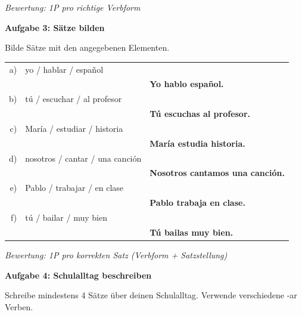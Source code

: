 \documentclass[11pt, a4paper]{article}
\newcommand{\fachfarbe}{spanisch}
\newcommand{\punktebox}[1]{\hfill\fbox{\small \_/#1}}
\newcommand{\loesung}[1]{\textcolor{loesung}{\textbf{#1}}}
\newenvironment{aufgabe}[1]{%
    \needspace{5\baselineskip}%
    \nopagebreak[4]%
    \vspace{10pt}
    \noindent\textbf{\textcolor{\fachfarbe}{Aufgabe #1}}
    \nopagebreak[4]%
    \vspace{5pt}
    \nopagebreak[4]%
    \begin{list}{}{\leftmargin=0pt}
    \item[]
}{%
    \end{list}
}
\begin{document}
\vspace{0.5em}
\textit{\textcolor{grau}{Bewertung: 1P pro richtige Verbform}}

\vspace{15pt}


\begin{aufgabe}{3: Sätze bilden}
Bilde Sätze mit den angegebenen Elementen. \punktebox{6}
\end{aufgabe}

\noindent
\begin{tabular}{rlp{9cm}}
a) & yo / hablar / español & \\[0.3em]
   & & \loesung{Yo hablo español.} \\[1em]

b) & tú / escuchar / al profesor & \\[0.3em]
   & & \loesung{Tú escuchas al profesor.} \\[1em]

c) & María / estudiar / historia & \\[0.3em]
   & & \loesung{María estudia historia.} \\[1em]

d) & nosotros / cantar / una canción & \\[0.3em]
   & & \loesung{Nosotros cantamos una canción.} \\[1em]

e) & Pablo / trabajar / en clase & \\[0.3em]
   & & \loesung{Pablo trabaja en clase.} \\[1em]

f) & tú / bailar / muy bien & \\[0.3em]
   & & \loesung{Tú bailas muy bien.} \\
\end{tabular}

\vspace{0.5em}
\textit{\textcolor{grau}{Bewertung: 1P pro korrekten Satz (Verbform + Satzstellung)}}

\vspace{15pt}


\begin{aufgabe}{4: Schulalltag beschreiben}
Schreibe mindestens 4 Sätze über deinen Schulalltag. Verwende verschiedene -ar Verben. \punktebox{6}
\end{aufgabe}
\end{document}
